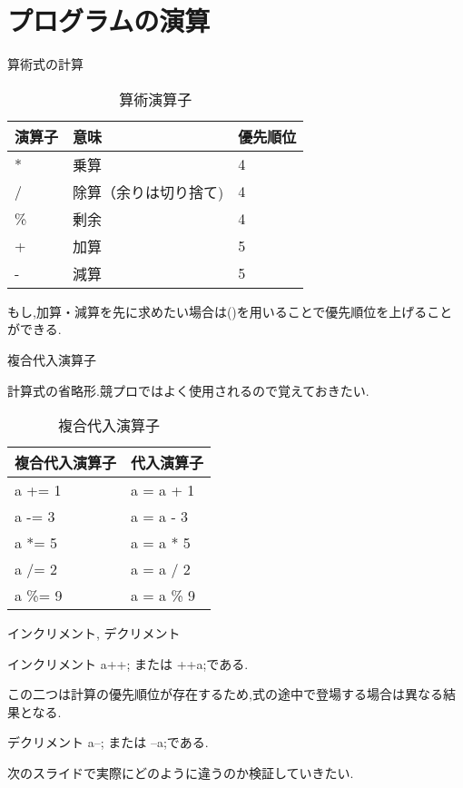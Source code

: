 \documentclass[xdvipdfmx, 8pt, t]{beamer}
\begin{document}
\section{プログラムの演算}
\begin{frame}{算術式の計算}
    \begin{table}[]
        \centering
        \begin{tabular}{|l|l|l|}
            \hline
            演算子 & 意味 & 優先順位\\
            \hline
            * & 乗算 & 4\\
            / & 除算（余りは切り捨て) & 4\\
            \% & 剰余 & 4\\
            + & 加算 & 5\\
            - & 減算 & 5\\
            \hline
        \end{tabular}
        \caption{算術演算子}
        \label{tab:my_label}
    \end{table}
    \begin{block}{}
        もし,加算・減算を先に求めたい場合は()を用いることで優先順位を上げることができる.
    \end{block}
\end{frame}

\begin{frame}{複合代入演算子}
    \begin{block}{}
        計算式の省略形.競プロではよく使用されるので覚えておきたい.
    \end{block}
    \begin{table}[]
        \centering
        \begin{tabular}{|l|l|}
            \hline
            複合代入演算子 & 代入演算子 \\
            \hline
            a += 1 & a = a + 1\\
            a -= 3 & a = a - 3\\
            a *= 5 & a = a * 5\\
            a /= 2 & a = a / 2\\
            a \%= 9 & a = a \% 9\\
            \hline
        \end{tabular}
        \caption{複合代入演算子}
        \label{tab:my_label}
    \end{table}
\end{frame}

\begin{frame}{インクリメント, デクリメント}
    \begin{block}{インクリメント}
        a++; または ++a;である.
        
        この二つは計算の優先順位が存在するため,式の途中で登場する場合は異なる結果となる.
    \end{block}
    \begin{block}{デクリメント}
        a--; または --a;である.
    \end{block}
    次のスライドで実際にどのように違うのか検証していきたい.
\end{frame}
\end{document}
